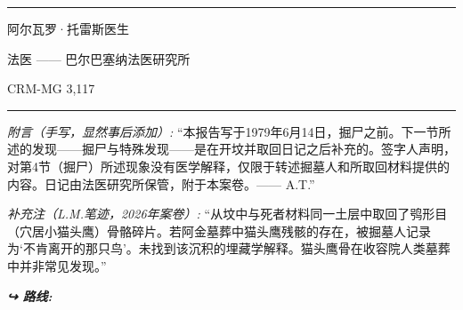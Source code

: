 \vspace{0.5em}\noindent\rule{\textwidth}{0.5pt}\vspace{0.5em}

\noindent 阿尔瓦罗·托雷斯医生

\noindent 法医 —— 巴尔巴塞纳法医研究所

\noindent CRM-MG 3,117

\vspace{0.5em}\noindent\rule{\textwidth}{0.5pt}\vspace{0.5em}

\noindent \textit{附言（手写，显然事后添加）:} “本报告写于1979年6月14日，掘尸之前。下一节所述的发现——掘尸与特殊发现——是在开坟并取回日记之后补充的。签字人声明，对第4节（掘尸）所述现象没有医学解释，仅限于转述掘墓人和所取回材料提供的内容。日记由法医研究所保管，附于本案卷。—— A.T.”

\noindent \textit{补充注（L.M.笔迹，2026年案卷）:} “从坟中与死者材料同一土层中取回了鸮形目（穴居小猫头鹰）骨骼碎片。若阿金墓葬中猫头鹰残骸的存在，被掘墓人记录为‘不肯离开的那只鸟’。未找到该沉积的埋藏学解释。猫头鹰骨在收容院人类墓葬中并非常见发现。”

\noindent\textit{\textbf{↪ 路线:}  \rotasep {} \rotasep {} \rotasep {}}
